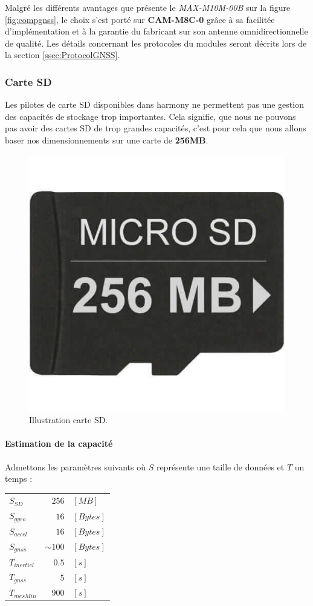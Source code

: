 Malgré les différents avantages que présente le \textit{MAX-M10M-00B} sur la figure \ref{fig:compgnss}, le choix s'est porté sur \textbf{CAM-M8C-0} grâce à sa facilitée d'implémentation et à la garantie du fabricant sur son antenne omnidirectionnelle de qualité. Les détails concernant les protocoles du modules seront décrits lors de la section \ref{ssec:ProtocolGNSS}.

\clearpage

\subsubsection{Carte SD} 
Les pilotes de carte SD disponibles dans \gls{harmony} ne permettent pas une gestion des capacités de stockage trop importantes. Cela signifie, que nous ne pouvons pas avoir des cartes SD de trop grandes capacités, c'est pour cela que nous allons baser nos dimensionnements sur une carte de \textbf{256MB}. 

\begin{figure}[h]
	\centering
	\includegraphics[width=0.2\linewidth]{../figures/pre_etude/CarteSD_Illustration}
	\caption{Illustration carte SD.}
	\label{fig:cartesdillustration}
\end{figure}


\paragraph{Estimation de la capacité} Admettons les paramètres suivants où $S$ représente une taille de données et $T$ un temps :

\begin{tabular}{lrl}
	$S_{SD}$ & $256$ & $[MB]$ \\
	$S_{gyro}$ & $16$ & $[Bytes]$ \\
	$S_{accel}$ & $16$ & $[Bytes]$ \\
	$S_{gnss}$ & $\sim100$ & $[Bytes]$ \\
	$T_{inertiel}$ & $0.5$ & $[s]$ \\
	$T_{gnss}$ & $5$ & $[s]$ \\
	$T_{mesMin}$ & $900$ & $[s]$ \\
\end{tabular}

